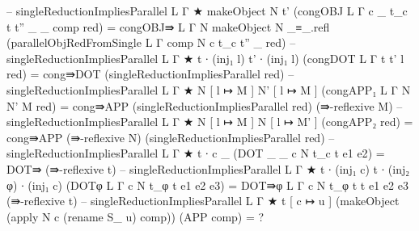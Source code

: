 {\begin{code}
  -- singleReductionImpliesParallel {L} {Γ} {★} {makeObject N} {t'} (congOBJ {L} {Γ} {c} {_} {t_c} {t} {t''} {_} {_} {comp} red) = congOBJ⇛ {L} {Γ} {N} {makeObject N} {_≡_.refl} (parallelObjRedFromSingle {L} {Γ} {comp} N c t_c t'' _ red)
  -- singleReductionImpliesParallel {L} {Γ} {★} {t ∙ (inj₁ l)} {t' ∙ (inj₁ l)} (congDOT {L} {Γ} {t} {t'} {l} red) = cong⇛DOT (singleReductionImpliesParallel red)
  -- singleReductionImpliesParallel {L} {Γ} {★} {N [ l ↦ M ]} {N' [ l ↦ M ]} (congAPP₁ {L} {Γ} {N} {N'} {M} red) = cong⇛APP (singleReductionImpliesParallel red) (⇛-reflexive M)
  -- singleReductionImpliesParallel {L} {Γ} {★} {N [ l ↦ M ]} {N [ l ↦ M' ]} (congAPP₂ red) = cong⇛APP (⇛-reflexive N) (singleReductionImpliesParallel red)
  -- singleReductionImpliesParallel {L} {Γ} {★} { t ∙ c } {_} (DOT {_} {_} {c} {N} {t_c} {t} {e1} {e2}) = DOT⇛ (⇛-reflexive t)
  -- singleReductionImpliesParallel {L} {Γ} {★} {t ∙ (inj₁ c)} {t ∙ (inj₂ φ) ∙ (inj₁ c)} (DOTφ {L} {Γ} {c} {N} {t_φ} {t} {e1} {e2} {e3}) = DOT⇛φ {L} {Γ} {c} {N} {t_φ} {t} {t} {e1} {e2} {e3} (⇛-reflexive t)
  -- singleReductionImpliesParallel {L} {Γ} {★} {t [ c ↦ u ]} {(makeObject (apply N c (rename S_ u) comp))} (APP comp) = ?

\end{code}}     